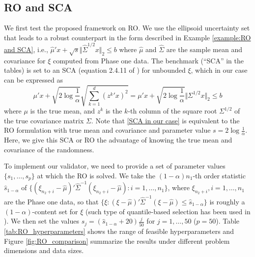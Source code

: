 \documentclass[mnsc,blindrev]{informs4} %
\begin{document}
\subsection{RO and SCA}
We first test the proposed framework on RO. We use the ellipsoid uncertainty set that leads to a robust counterpart in the form described in Example \ref{example:RO and SCA}, i.e., $\hat{\mu}'x+\sqrt{s}\Vert\hat{\Sigma}^{1/2}x\Vert_2\leq b$ where $\hat{\mu}$ and $\hat{\Sigma}$ are the sample mean and covariance for $\xi$ computed from Phase one data. The benchmark (``SCA'' in the tables) is set to an SCA (equation 2.4.11 of \cite{ben2009robust}) for unbounded $\xi$, which in our case can be expressed as
\begin{equation}\label{SCA in our case}
\mu'x+\sqrt{2\log\frac{1}{\alpha}}\sqrt{\sum_{k=1}^d({z^k}'x)^2}=\mu'x+\sqrt{2\log\frac{1}{\alpha}}\Vert\Sigma^{1/2}x\Vert_2\leq b
\end{equation}
where $\mu$ is the true mean, and $z^k$ is the $k$-th column of the square root $\Sigma^{1/2}$ of the true covariance matrix $\Sigma$. Note that \eqref{SCA in our case} is equivalent to the RO formulation with true mean and covariance and parameter value $s=2\log\frac{1}{\alpha}$. Here, we give this SCA or RO the advantage of knowing the true mean and covariance of the randomness.

To implement our validator, we need to provide a set of parameter values $\{s_1,\ldots,s_p\}$ at which the RO is solved. We take the $(1-\alpha)n_1$-th order statistic $\hat s_{1-\alpha}$ of $\{(\xi_{n_2+i}-\hat\mu)'\hat{\Sigma}^{-1}(\xi_{n_2+i}-\hat\mu):i=1,\ldots,n_1\}$, where $\xi_{n_2+i},i=1,\ldots,n_1$ are the Phase one data, so that $\{\xi:(\xi-\hat\mu)'\hat{\Sigma}^{-1}(\xi-\hat\mu)\leq \hat s_{1-\alpha}\}$ is roughly a $(1-\alpha)$-content set for $\xi$ (such type of quantile-based selection has been used in \cite{hong2017learning}). We then set the values $s_j=(\hat s_{1-\alpha}+20)\frac{j}{50}$ for $j=1,\ldots,50$ ($p=50$). Table \ref{tab:RO_hyperparameters} shows the range of feasible hyperparameters and Figure \ref{fig:RO_comparison} summarize the results under different problem dimensions and data sizes.

%
\end{document}
